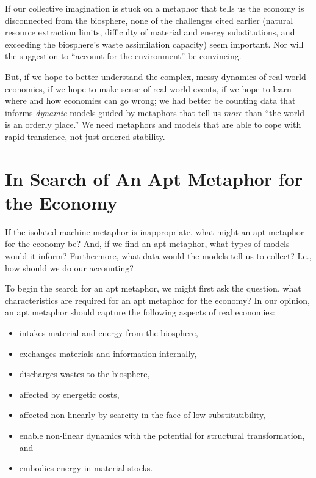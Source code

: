 If our collective imagination is stuck on a metaphor that tells us 
the economy is disconnected from the biosphere,
none of the challenges cited earlier (natural resource extraction limits,
difficulty of material and energy substitutions, and 
exceeding the biosphere's waste assimilation capacity)
seem important. 
Nor will the suggestion to ``account for the environment'' be convincing.

But, if we hope to better understand the complex, 
messy dynamics of real-world economies,
if we hope to make sense of real-world events, 
if we hope to learn where and how economies can go wrong;
we had better be counting data that informs \emph{dynamic} models
guided by metaphors that tell us \emph{more} than ``the world is an orderly place.''
We need metaphors and models that are
able to cope with rapid transience,
not just ordered stability.


\section{In Search of An Apt Metaphor for the Economy}
\label{sec:apt_metaphor}

If the isolated machine metaphor is inappropriate, 
what might an apt metaphor for the economy be?
And, if we find an apt metaphor, what types of models would it inform?
Furthermore, what data would the models tell us to collect?
I.e., how should we do our accounting?

To begin the search for an apt metaphor, 
we might first ask the question, 
what characteristics are required for an apt metaphor for the economy?
In our opinion, an apt metaphor should capture the following
aspects of real economies:

\begin{itemize}
	\item{intakes material and energy from the biosphere,}
	\item{exchanges materials and information internally,}
	\item{discharges wastes to the biosphere,}
	\item{affected by energetic costs,}
	\item{affected non-linearly by scarcity in the face of low substitutibility,}
	\item{enable non-linear dynamics with the potential for structural transformation, and}
	\item{embodies energy in material stocks.}
\end{itemize}

